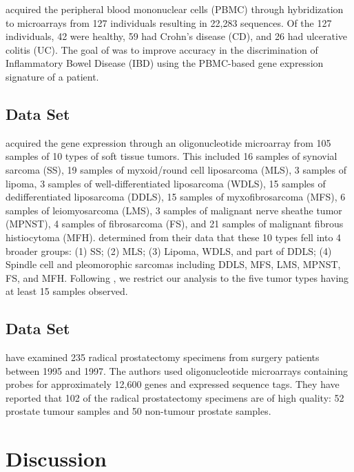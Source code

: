\documentclass[11pt]{article}
\begin{document}
\cite{Burczynski:2006ik} acquired the peripheral blood mononuclear cells (PBMC) through hybridization to microarrays from 127 individuals resulting in 22,283 sequences. Of the 127 individuals, 42 were healthy, 59 had Crohn's disease (CD), and 26 had ulcerative colitis (UC). The goal of \cite{Burczynski:2006ik} was to improve accuracy in the discrimination of Inflammatory Bowel Disease (IBD) using the PBMC-based gene expression signature of a patient.

\subsection{\cite{Nakayama:2007fl} Data Set}

\cite{Nakayama:2007fl} acquired the gene expression through an oligonucleotide microarray from 105 samples of 10 types of soft tissue tumors. This included 16 samples of synovial sarcoma (SS), 19 samples of myxoid/round cell liposarcoma (MLS), 3 samples of lipoma, 3 samples of well-differentiated liposarcoma (WDLS), 15 samples of dedifferentiated liposarcoma (DDLS), 15 samples of myxofibrosarcoma (MFS), 6 samples of leiomyosarcoma (LMS), 3 samples of malignant nerve sheathe tumor (MPNST), 4 samples of fibrosarcoma (FS), and 21 samples of malignant fibrous histiocytoma (MFH). \cite{Nakayama:2007fl} determined from their data that these 10 types fell into 4 broader groups: (1) SS; (2) MLS; (3) Lipoma, WDLS, and part of DDLS; (4) Spindle cell and pleomorophic sarcomas including DDLS, MFS, LMS, MPNST, FS, and MFH. Following \cite{Witten:2011kc}, we restrict our analysis to the five tumor types having at least 15 samples observed.

\subsection{\cite{Singh:2002fh} Data Set}

\cite{Singh:2002fh} have examined 235 radical prostatectomy specimens from surgery patients between 1995 and 1997. The authors used oligonucleotide microarrays containing probes for approximately 12,600 genes and expressed sequence tags. They have reported that 102 of the radical prostatectomy specimens are of high quality: 52 prostate tumour samples and 50 non-tumour prostate samples.


\section{Discussion}
\end{document}
